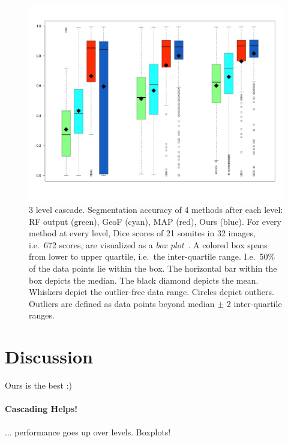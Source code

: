 \documentclass[10pt,twocolumn,letterpaper]{article}
\begin{document}
\begin{figure}[tb]
\centering
\small
\begin{center}
\includegraphics[width=\columnwidth]{Cascade.jpeg} %
\end{center}
\label{fig:boxplots}
\caption{3 level cascade. Segmentation accuracy of 4 methods after each level: RF output (green), GeoF (cyan), MAP (red), Ours (blue). For every method at every level, Dice scores of 21 somites in 32 images, i.e.\ 672 scores, are visualized as a \emph{box plot}~\cite{chambers1983graphical}. A colored box spans from lower to upper quartile, i.e.\ the inter-quartile range. I.e.\ 50\% of the data points lie within the box. The horizontal bar within the box depicts the median. The black diamond depicts the mean. Whiskers depict the outlier-free data range. Circles depict outliers. Outliers are defined as data points beyond median $\pm$ 2 inter-quartile ranges. }
\end{figure}





\section{Discussion}
Ours is the best :)

\paragraph{Cascading Helps!}
... performance goes up over levels. Boxplots!
\end{document}
